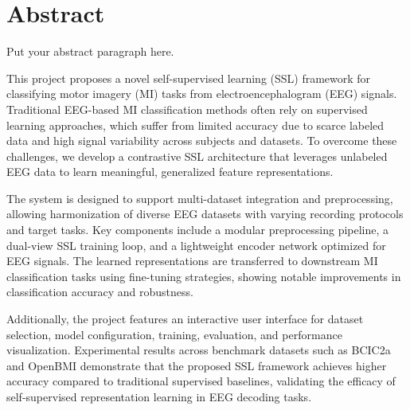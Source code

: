 \chapter*{Abstract}
\label{chap:abstract}

Put your abstract paragraph here.

This project proposes a novel self-supervised learning (SSL) framework for classifying motor imagery (MI) tasks from electroencephalogram (EEG) signals. Traditional EEG-based MI classification methods often rely on supervised learning approaches, which suffer from limited accuracy due to scarce labeled data and high signal variability across subjects and datasets. To overcome these challenges, we develop a contrastive SSL architecture that leverages unlabeled EEG data to learn meaningful, generalized feature representations.

The system is designed to support multi-dataset integration and preprocessing, allowing harmonization of diverse EEG datasets with varying recording protocols and target tasks. Key components include a modular preprocessing pipeline, a dual-view SSL training loop, and a lightweight encoder network optimized for EEG signals. The learned representations are transferred to downstream MI classification tasks using fine-tuning strategies, showing notable improvements in classification accuracy and robustness.

Additionally, the project features an interactive user interface for dataset selection, model configuration, training, evaluation, and performance visualization. Experimental results across benchmark datasets such as BCIC2a and OpenBMI demonstrate that the proposed SSL framework achieves higher accuracy compared to traditional supervised baselines, validating the efficacy of self-supervised representation learning in EEG decoding tasks.
